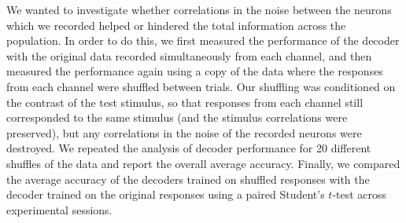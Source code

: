 We wanted to investigate whether correlations in the noise between the neurons which we recorded helped or hindered the total information across the population.
In order to do this, we first measured the performance of the decoder with the original data recorded simultaneously from each channel, and then measured the performance again using a copy of the data where the responses from each channel were shuffled between trials.
Our shuffling was conditioned on the contrast of the test stimulus, so that responses from each channel still corresponded to the same stimulus (and the stimulus correlations were preserved), but any correlations in the noise of the recorded neurons were destroyed.
We repeated the analysis of decoder performance for \num{20} different shuffles of the data and report the overall average accuracy.
Finally, we compared the average accuracy of the decoders trained on shuffled responses with the decoder trained on the original responses using a paired Student's $t$-test across experimental sessions.

